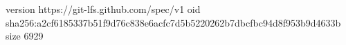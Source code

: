version https://git-lfs.github.com/spec/v1
oid sha256:a2cf6185337b51f9d76c838e6acfc7d5b5220262b7dbcfbc94d8f953b9d4633b
size 6929

